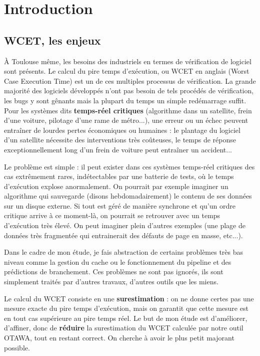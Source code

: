 \documentclass[french]{article}
\begin{document}
  \pagebreak{}
  \tableofcontents{}


  \newpage{}
  \section{Introduction}
  \subsection{WCET, les enjeux}
  \`A Toulouse même, les besoins des industriels en termes de vérification de logiciel sont présents. Le calcul du pire temps d'exécution, ou WCET en anglais (Worst Case Execution Time) est un de ces multiples processus de vérification. La grande majorité des logiciels développés n'ont pas besoin de tels procédés de vérification, les bugs y sont gênants mais la plupart du temps un simple redémarrage suffit. Pour les systèmes dits \textbf{temps-réel critiques} (algorithme dans un satellite, frein d'une voiture, pilotage d'une rame de métro...), une erreur ou un échec peuvent entraîner de lourdes pertes économiques ou humaines : le plantage du logiciel d'un satellite nécessite des interventions très coûteuses, le temps de réponse exceptionnellement long d'un frein de voiture peut entraîner un accident...

  Le problème est simple : il peut exister dans ces systèmes temps-réel critiques des cas extrêmement rares, indétectables par une batterie de tests, où le temps d'exécution explose anormalement. On pourrait par exemple imaginer un algorithme qui sauvegarde (disons hebdomadairement) le contenu de ses données sur un disque externe. Si tout est géré de manière synchrone et qu'un ordre critique arrive à ce moment-là, on pourrait se retrouver avec un temps d'exécution très élevé. On peut imaginer plein d'autres exemples (une plage de données très fragmentée qui entrainerait des défauts de page en masse, etc...).

  Dans le cadre de mon étude, je fais abstraction de certains problèmes très bas niveau comme la gestion du cache ou le fonctionnement du pipeline et des prédictions de branchement. Ces problèmes ne sont pas ignorés, ils sont simplement traités par d'autres travaux, d'autres outils que les miens.

  Le calcul du WCET consiste en une \textbf{surestimation} : on ne donne certes pas une mesure exacte du pire temps d'exécution, mais on garantit que cette mesure est en tout cas supérieure au pire temps réel. Le but de mon étude est d'améliorer, d'affiner, donc de \textbf{réduire} la surestimation du WCET calculée par notre outil OTAWA, tout en restant correct. On cherche à avoir le plus petit majorant possible.
\end{document}
